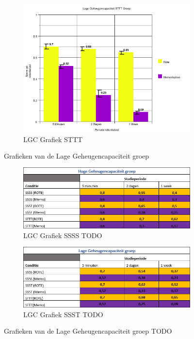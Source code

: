 \documentclass{hogent-article}
\begin{document}
\begin{figure}[H]
\begin{subfigure}{0.45\textwidth}
        \includegraphics[width=\linewidth]{graph6}
        \caption{LGC Grafiek STTT}
    \end{subfigure}
    \caption{Grafieken van de Lage Geheugencapaciteit groep}
\end{figure}
\begin{figure}[H]
    \begin{subfigure}{0.45\textwidth}
        \includegraphics[width=\linewidth]{table1}
        \caption{LGC Grafiek SSSS TODO}
    \end{subfigure}
    \begin{subfigure}{0.45\textwidth}
        \includegraphics[width=\linewidth]{table2}
        \caption{LGC Grafiek SSST TODO}
    \end{subfigure}
    \caption{Grafieken van de Lage Geheugencapaciteit groep TODO}
\end{figure}
\end{document}

